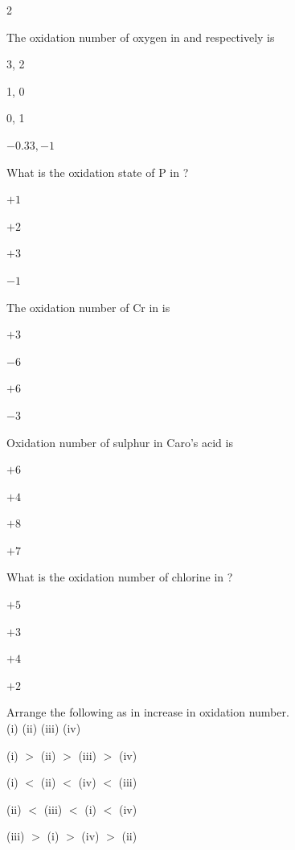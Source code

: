 \documentclass[10pt,a4paper]{article}
\begin{document}
\begin{multicols}{2}
\begin{questions}[start=56]
\item The oxidation number of oxygen in  and  respectively is
\begin{options}
  \item 3, 2
  \item 1, 0
  \item 0, 1
  \item $-0.33, -1$
\end{options}

\item What is the oxidation state of P in ?
\begin{options}
  \item $+1$
  \item $+2$
  \item $+3$
  \item $-1$
\end{options}

\item The oxidation number of Cr in  is
\begin{options}
  \item $+3$
  \item $-6$
  \item $+6$
  \item $-3$
\end{options}

\item Oxidation number of sulphur in Caro's acid is
\begin{options}
  \item $+6$
  \item $+4$
  \item $+8$
  \item $+7$
\end{options}

\item What is the oxidation number of chlorine in ?
\begin{options}
  \item $+5$
  \item $+3$
  \item $+4$
  \item $+2$
\end{options}

\item Arrange the following as in increase in oxidation number.\\
(i)  \quad (ii)  \quad (iii)  \quad (iv) 
\begin{options}
  \item (i) $>$ (ii) $>$ (iii) $>$ (iv)
  \item (i) $<$ (ii) $<$ (iv) $<$ (iii)
  \item (ii) $<$ (iii) $<$ (i) $<$ (iv)
  \item (iii) $>$ (i) $>$ (iv) $>$ (ii)
\end{options}


\end{questions}
\end{multicols}
\end{document}

